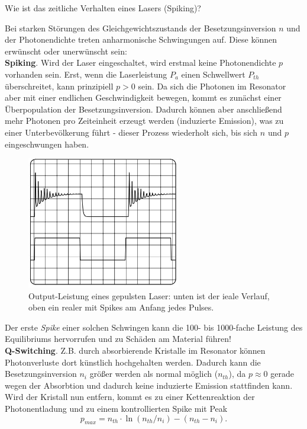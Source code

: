 \documentclass{subfiles}
\begin{document}
    \begin{Frage}
        Wie ist das zeitliche Verhalten eines Lasers (Spiking)?
    \end{Frage}
    \begin{Antwort}
        Bei starken Störungen des Gleichgewichtszustands der Besetzungsinversion $n$ und der Photonendichte treten anharmonische Schwingungen auf. Diese können erwünscht oder unerwünscht sein:\\

        \textbf{Spiking}. Wird der Laser eingeschaltet, wird erstmal keine Photonendichte $p$ vorhanden sein. Erst, wenn die Laserleistung $P_a$ einen Schwellwert $P_{th}$ überschreitet, kann prinzipiell $p>0$ sein. Da sich die Photonen im Resonator aber mit einer endlichen Geschwindigkeit bewegen, kommt es zunächst einer Überpopulation der Besetzungsinversion. Dadurch können aber anschließend mehr Photonen pro Zeiteinheit erzeugt werden (induzierte Emission), was zu einer Unterbevölkerung führt - dieser Prozess wiederholt sich, bis sich $n$ und $p$ eingeschwungen haben.

        \begin{figure}[H]
            \centering
            \includegraphics[width=0.6\textwidth]{Bilddateien/Spiking.jpg}
            \caption{Output-Leistung eines gepulsten Laser: unten ist der ieale Verlauf, oben ein realer mit Spikes am Anfang jedes Pulses.}
        \end{figure}

        Der erste \textit{Spike} einer solchen Schwingen kann die 100- bis 1000-fache Leistung des Equilibriums hervorrufen und zu Schäden am Material führen!\\

        \noindent\textbf{Q-Switching}. Z.B. durch absorbierende Kristalle im Resonator können Photonverluste dort künstlich hochgehalten werden. Dadurch kann die Besetzungsinversion $n_i$ größer werden als normal möglich ($n_{th}$), da $p\approx 0$ gerade wegen der Absorbtion und dadurch keine induzierte Emission stattfinden kann. Wird der Kristall nun entfern, kommt es zu einer Kettenreaktion der Photonentladung und zu einem kontrollierten Spike mit Peak 
        \[
            p_{max} = n_{th}\cdot\ln(n_{th} / n_i) - (n_{th} - n_i).    
        \]
        
    \end{Antwort}
\end{document}
